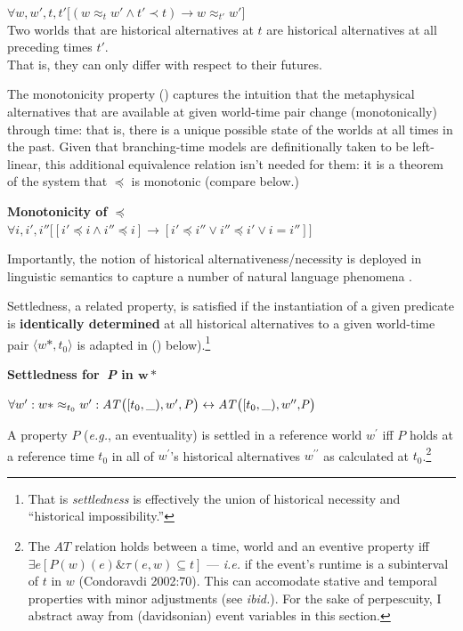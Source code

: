 \documentclass[11pt,dvipsnames]{report}
\begin{document}
	 $ \forall w,w',t,t'\big[(w\approx_t w'\wedge t'\prec t)\to w\approx_{t'} w'\big]$\\
	Two worlds that are historical alternatives at $t$ are historical alternatives at all preceding times $t'$.\\That is, they can only differ with respect to their futures.
	\xe

The monotonicity property () captures the intuition that the metaphysical alternatives that are available at given world-time pair change (monotonically) through time: that is, there is a unique possible state of the worlds at all times in the past.  Given that branching-time models are definitionally taken to be left-linear, this additional equivalence relation isn't needed for them: it is a theorem of the system that $ \preccurlyeq $ is monotonic (compare  below.)

\pex[exno=\getref{histaltdef}]
\a[label=b′] \textbf{Monotonicity of $ \boldsymbol\preccurlyeq $}\\$ \forall i,i',i''\big[[i'\preccurlyeq i\wedge i''\preccurlyeq i]\to [i'\preccurlyeq i'' \vee i'' \preccurlyeq i' \vee i=i'']\big] $
\xe


Importantly, the notion of historical alternativeness/necessity is deployed in linguistic semantics to capture a number of natural language phenomena \citep[\textit{e.g.},][]{Thomason1984,Condoravdi2002,Kaufmann2002}.

Settledness, a related property, is satisfied if the instantiation of a given predicate is \textbf{identically determined} at all historical alternatives to a given world-time pair $\langle w*,t_0\rangle $ is adapted in () below).\footnote{That is \textit{settledness} is effectively the union of historical necessity and ``historical impossibility.''}

\pex \textbf{Settledness for\textbf{\textit{\ P}} in $ \boldsymbol{w*}$}


$\forall w^{\prime}:w*\approx_{t_0}w^{\prime}:\\\mathit{AT}\big([t_0,\_),w^\prime, \mathit P\big)\leftrightarrow \mathit{AT}\big([t_0,\_),w^{\prime\prime},\mathit{\!P}\big)$%


A property $P$ (\textit{e.g.}, an eventuality) is settled in a reference world $w^\prime$ iff $\mathit P$ holds at a reference time $t_0$ in all of $w^\prime$'s historical alternatives $w^{\prime\prime}$ as calculated at $t_0$.\footnote{The $AT$ relation holds between a time, world and an eventive property iff $\exists e[\mathit P(w)(e)\&\tau(e,w)\subseteq t]$ --- \textit{i.e.} if the event's runtime is a subinterval of $t$ in $w$ (Condoravdi 2002:70). This can accomodate stative and temporal properties with minor adjustments (see \textit{ibid.}). For the sake of perpescuity, I abstract away from (davidsonian) event variables in this section.}
\xe
\end{document}
